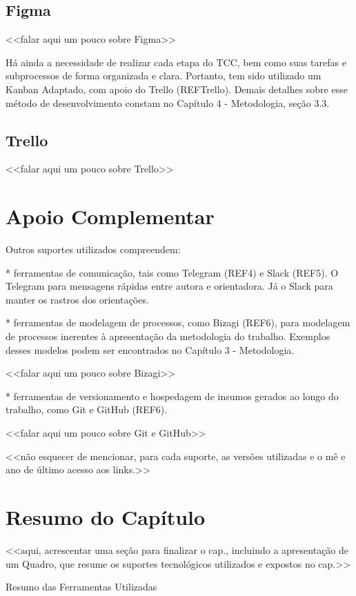 \subsection{Figma}
<<falar aqui um pouco sobre Figma>>

Há ainda a necessidade de realizar cada etapa do TCC, bem como suas tarefas e subprocessos de forma organizada e clara. Portanto, tem sido utilizado um Kanban Adaptado, com apoio do Trello (REFTrello). Demais detalhes sobre esse método de desenvolvimento constam no Capítulo 4 - Metodologia, seção 3.3.

\subsection{Trello}
<<falar aqui um pouco sobre Trello>>

\section{Apoio Complementar} \label{complementar}

Outros suportes utilizados compreendem:

* ferramentas de comunicação, tais como Telegram (REF4) e Slack (REF5). O Telegram para mensagens rápidas entre autora e orientadora. Já o Slack para manter os rastros dos orientações.

* ferramentas de modelagem de processos, como Bizagi (REF6), para modelagem de processos inerentes à apresentação da metodologia do trabalho. Exemplos desses modelos podem ser encontrados no Capítulo 3 - Metodologia.

<<falar aqui um pouco sobre Bizagi>>

* ferramentas de versionamento e hospedagem de insumos gerados ao longo do trabalho, como Git e GitHub (REF6).

<<falar aqui um pouco sobre Git e GitHub>>

<<não esquecer de mencionar, para cada suporte, as versões utilizadas e o mê e ano de último acesso aos links.>>

\section{Resumo do Capítulo} \label{resumo}

<<aqui, acrescentar uma seção para finalizar o cap., incluindo a apresentação de um Quadro, que resume os suportes tecnológicos utilizados e expostos no cap.>>

\begin{quadro}
\caption{\label{quadro_modelo}Resumo das Ferramentas Utilizadas}



\end{quadro} 
